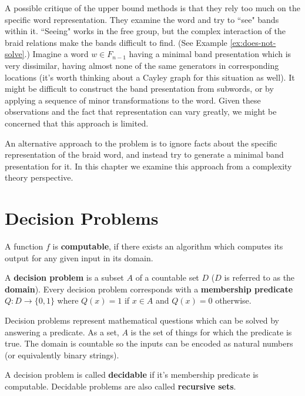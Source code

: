 \documentclass[12pt]{thesis}
\begin{document}
\label{chap:complexity}

A possible critique of the upper bound methods is that they rely too much on
the specific word representation.
They examine the word and try to ``see" bands within it.
``Seeing" works in the free group,
but the complex interaction of the braid relations make the bands
difficult to find. (See Example \ref{ex:does-not-solve}.)
Imagine a word $w \in F_{n-1}$ having a minimal band presentation
which is very dissimilar, having almost none of the same generators
in corresponding locations (it's worth thinking about a Cayley graph for this situation as well).
It might be difficult to construct the band presentation
from subwords, or by applying a sequence of minor transformations to the word.
Given these observations and the fact that representation can vary greatly,
we might be concerned that this approach is limited. 

An alternative approach to the problem is to ignore facts about the specific representation
of the braid word, and instead try to generate a minimal band presentation for it.
In this chapter we examine this approach from a complexity theory perspective.

\section{Decision Problems}

\begin{definition}
    A function $f$ is \textbf{computable}, if there exists an algorithm 
    which computes its output for any given input in its domain.
\end{definition}

\begin{definition}
    A \textbf{decision problem} is a subset $A$ of a countable set $D$ ($D$ is referred to as the \textbf{domain}).
    Every decision problem corresponds with a \textbf{membership predicate}
    $Q \colon D \rightarrow \{ 0, 1 \}$
    where $Q(x) = 1$ if $x \in A$ and $Q(x) = 0$ otherwise.
\end{definition}

Decision problems represent mathematical questions which 
can be solved by answering a predicate.
As a set, $A$ is the set of things for which the predicate is true.
The domain is countable so the inputs can be encoded as natural numbers
(or equivalently binary strings).

\begin{definition}
    A decision problem is called \textbf{decidable} if it's
    membership predicate is computable.
    Decidable problems are also called \textbf{recursive sets}.
\end{definition}
\end{document}
